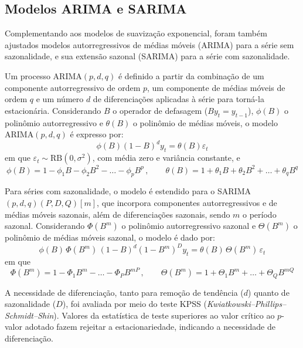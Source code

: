 \documentclass[12pt, a4paper]{article}
\begin{document}
\subsection{Modelos ARIMA e SARIMA}

Complementando aos modelos de suavização exponencial, foram também ajustados modelos autorregressivos de médias móveis (ARIMA) para a série sem sazonalidade, e sua extensão sazonal (SARIMA) para a série com sazonalidade.

Um processo ARIMA$(p,d,q)$ é definido a partir da combinação de um componente autorregressivo de ordem $p$, um componente de médias móveis de ordem $q$ e um número $d$ de diferenciações aplicadas à série para torná-la estacionária. Considerando $B$ o operador de defasagem ($By_t = y_{t-1}$), $\phi(B)$ o polinômio autorregressivo e $\theta(B)$ o polinômio de médias móveis, o modelo ARIMA$(p,d,q)$ é expresso por:
\begin{equation}
  \phi(B)(1-B)^d y_t = \theta(B)\varepsilon_t
\end{equation}
em que $\varepsilon_t \sim \text{RB}(0, \sigma^2)$, com média zero e variância constante, e
\begin{equation}
  \phi(B) = 1-\phi_1 B-\phi_2 B^2-\dots-\phi_p B^p\,, \qquad
  \theta(B) = 1+\theta_1 B+\theta_2 B^2+\dots+\theta_q B^q
\end{equation}

Para séries com sazonalidade, o modelo é estendido para o SARIMA$(p,d,q)(P,D,Q)[m]$, que incorpora componentes autorregressivos e de médias móveis sazonais, além de diferenciações sazonais, sendo $m$ o período sazonal. Considerando $\Phi(B^m)$ o polinômio autorregressivo sazonal e $\Theta(B^m)$ o polinômio de médias móveis sazonal, o modelo é dado por:
\begin{equation}
  \phi(B)\,\Phi(B^m)\,(1-B)^d(1-B^m)^D y_t = \theta(B)\,\Theta(B^m)\,\varepsilon_t
\end{equation}
em que
\begin{equation}
  \Phi(B^m) = 1-\Phi_1 B^m-\dots-\Phi_P B^{mP}\,, \qquad
  \Theta(B^m) = 1+\Theta_1 B^m+\dots+\Theta_Q B^{mQ}
\end{equation}

A necessidade de diferenciação, tanto para remoção de tendência ($d$) quanto de sazonalidade ($D$), foi avaliada por meio do teste KPSS (\textit{Kwiatkowski--Phillips--Schmidt--Shin}). Valores da estatística de teste superiores ao valor crítico ao $p$-valor adotado fazem rejeitar a estacionariedade, indicando a necessidade de diferenciação.
\end{document}
